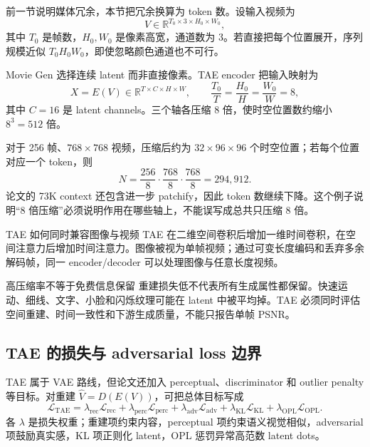 前一节说明媒体冗余，本节把冗余换算为 token 数。设输入视频为
\[
V\in\mathbb R^{T_0\times 3\times H_0\times W_0},
\]
其中 $T_0$ 是帧数，$H_0,W_0$ 是像素高宽，通道数为 3。若直接把每个位置展开，序列规模近似 $T_0H_0W_0$，即使忽略颜色通道也不可行。


Movie Gen 选择连续 latent 而非直接像素。TAE encoder 把输入映射为
\[
X=E(V)\in\mathbb R^{T\times C\times H\times W},
\qquad
\frac{T_0}{T}=\frac{H_0}{H}=\frac{W_0}{W}=8,
\]
其中 $C=16$ 是 latent channels。三个轴各压缩 8 倍，使时空位置数约缩小 $8^3=512$ 倍。


对于 256 帧、$768\times768$ 视频，压缩后约为 $32\times96\times96$ 个时空位置；若每个位置对应一个 token，则
\[
N=\frac{256}{8}\cdot\frac{768}{8}\cdot\frac{768}{8}
=294{,}912.
\]
论文的 73K context 还包含进一步 patchify，因此 token 数继续下降。这个例子说明“8 倍压缩”必须说明作用在哪些轴上，不能误写成总共只压缩 8 倍。

\begin{knowledgebox}{TAE 如何同时兼容图像与视频}
TAE 在二维空间卷积后增加一维时间卷积，在空间注意力后增加时间注意力。图像被视为单帧视频；通过可变长度编码和丢弃多余解码帧，同一 encoder/decoder 可以处理图像与任意长度视频。
\end{knowledgebox}

\begin{warningbox}{高压缩率不等于免费信息保留}
重建损失低不代表所有生成属性都保留。快速运动、细线、文字、小脸和闪烁纹理可能在 latent 中被平均掉。TAE 必须同时评估空间重建、时间一致性和下游生成质量，不能只报告单帧 PSNR。
\end{warningbox}

\subsection{TAE 的损失与 adversarial loss 边界}

TAE 属于 VAE 路线，但论文还加入 perceptual、discriminator 和 outlier penalty 等目标。对重建 $\hat V=D(E(V))$，可把总体目标写成
\[
\mathcal L_{\mathrm{TAE}}
=\lambda_{\mathrm{rec}}\mathcal L_{\mathrm{rec}}
+\lambda_{\mathrm{perc}}\mathcal L_{\mathrm{perc}}
+\lambda_{\mathrm{adv}}\mathcal L_{\mathrm{adv}}
+\lambda_{\mathrm{KL}}\mathcal L_{\mathrm{KL}}
+\lambda_{\mathrm{OPL}}\mathcal L_{\mathrm{OPL}}.
\]
各 $\lambda$ 是损失权重；重建项约束内容，perceptual 项约束语义视觉相似，adversarial 项鼓励真实感，KL 项正则化 latent，OPL 惩罚异常高范数 latent dots。

